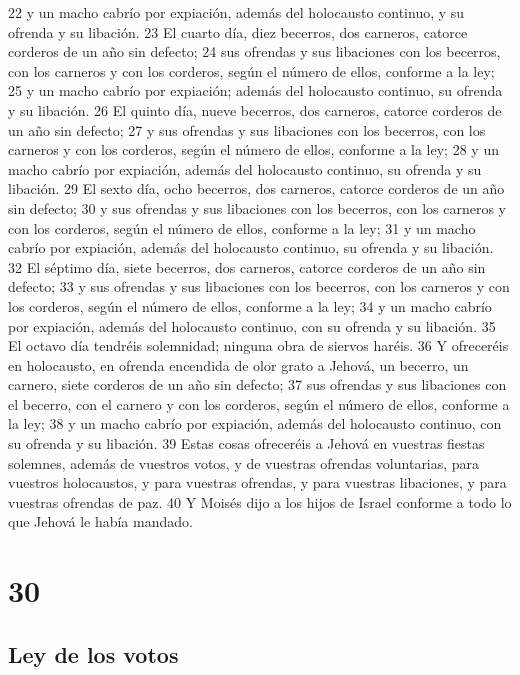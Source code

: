 22 y un macho cabrío por expiación, además del holocausto continuo, y su ofrenda y su libación.
23 El cuarto día, diez becerros, dos carneros, catorce corderos de un año sin defecto;
24 sus ofrendas y sus libaciones con los becerros, con los carneros y con los corderos, según el número de ellos, conforme a la ley;
25 y un macho cabrío por expiación; además del holocausto continuo, su ofrenda y su libación.
26 El quinto día, nueve becerros, dos carneros, catorce corderos de un año sin defecto;
27 y sus ofrendas y sus libaciones con los becerros, con los carneros y con los corderos, según el número de ellos, conforme a la ley;
28 y un macho cabrío por expiación, además del holocausto continuo, su ofrenda y su libación.
29 El sexto día, ocho becerros, dos carneros, catorce corderos de un año sin defecto;
30 y sus ofrendas y sus libaciones con los becerros, con los carneros y con los corderos, según el número de ellos, conforme a la ley;
31 y un macho cabrío por expiación, además del holocausto continuo, su ofrenda y su libación.
32 El séptimo día, siete becerros, dos carneros, catorce corderos de un año sin defecto;
33 y sus ofrendas y sus libaciones con los becerros, con los carneros y con los corderos, según el número de ellos, conforme a la ley;
34 y un macho cabrío por expiación, además del holocausto continuo, con su ofrenda y su libación.
35 El octavo día tendréis solemnidad; ninguna obra de siervos haréis.
36 Y ofreceréis en holocausto, en ofrenda encendida de olor grato a Jehová, un becerro, un carnero, siete corderos de un año sin defecto;
37 sus ofrendas y sus libaciones con el becerro, con el carnero y con los corderos, según el número de ellos, conforme a la ley;
38 y un macho cabrío por expiación, además del holocausto continuo, con su ofrenda y su libación.
39 Estas cosas ofreceréis a Jehová en vuestras fiestas solemnes, además de vuestros votos, y de vuestras ofrendas voluntarias, para vuestros holocaustos, y para vuestras ofrendas, y para vuestras libaciones, y para vuestras ofrendas de paz.
40 Y Moisés dijo a los hijos de Israel conforme a todo lo que Jehová le había mandado.

\chapter{30}

\section*{Ley de los votos}

